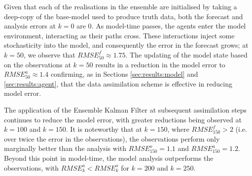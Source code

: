 Given that each of the realisations in the ensemble are initialised by taking a
deep-copy of the base-model used to produce truth data, both the forecast and
analysis errors at $k=0$ are $0$.
As model-time passes, the agents enter the model environment, interacting as
their paths cross.
These interactions inject some stochasticity into the model, and consequently
the error in the forecast grows; at $k=50$, we observe that $RMSE_{50}^{f}
\approx 1.75$.
The updating of the model state based on the observations at $k=50$ results in a
reduction in the model error to $RMSE_{50}^{a} \approx 1.4$ confirming, as in
Sections \ref{sec:results:model} and \ref{sec:results:agent}, that the data
assimilation scheme is effective in reducing model error.

The application of the Ensemble Kalman Filter at subsequent assimilation steps
continues to reduce the model error, with greater reductions being observed at
$k=100$ and $k=150$.
It is noteworthy that at $k=150$, where $RMSE_{150}^{f} > 2$ (i.e. over twice
the error in the observations), the observations perform only marginally better
than the analysis with $RMSE_{150}^{o} = 1.1$ and $RMSE_{150}^{a} = 1.2$.
Beyond this point in model-time, the model analysis outperforms the
observations, with $RMSE_{k}^{a} < RMSE_{k}^{o}$ for $k=200$ and $k=250$.

